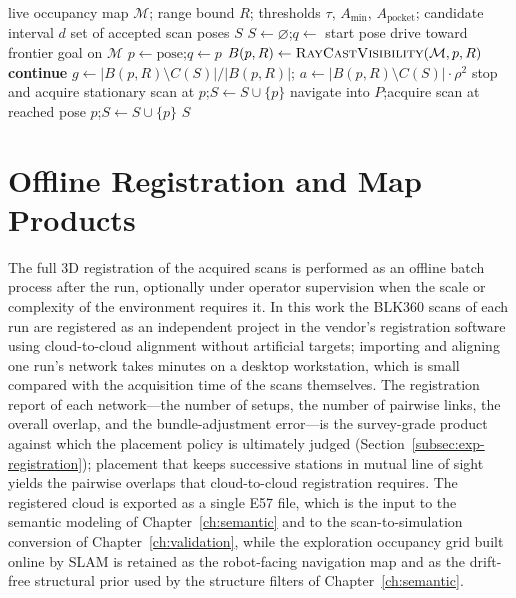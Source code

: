 \begin{algorithm}[H]
\caption{Visibility-based stop-and-scan placement}
\label{alg:placement}
\begin{algorithmic}[1]
\Require live occupancy map $\mathcal{M}$; range bound $R$; thresholds $\tau$, $A_{\min}$, $A_{\mathrm{pocket}}$; candidate interval $d$
\Ensure set of accepted scan poses $S$
\State $S \gets \varnothing$;\quad $q \gets$ start pose
  \State drive toward frontier goal on $\mathcal{M}$
    \State $p \gets \mathrm{pose}$;\quad $q \gets p$
    \State $B(p,R) \gets \textsc{RayCastVisibility}(\mathcal{M}, p, R)$
     \textbf{continue} 
    \EndIf
    \State $g \gets \lvert B(p,R)\setminus C(S)\rvert / \lvert B(p,R)\rvert$;\quad
           $a \gets \lvert B(p,R)\setminus C(S)\rvert \cdot \rho^2$
      \State stop and acquire stationary scan at $p$;\quad $S \gets S \cup \{p\}$
    \EndIf
  \EndIf
\EndWhile
{} 
  \State navigate into $P$;\quad acquire scan at reached pose $p$;\quad $S \gets S \cup \{p\}$
\EndWhile
\State \Return $S$
\end{algorithmic}
\end{algorithm}

\section{Offline Registration and Map Products}
\label{sec:registration}

The full 3D registration of the acquired scans is performed as an offline
batch process after the run, optionally under operator supervision when the
scale or complexity of the environment requires it. In this work the BLK360
scans of each run are registered as an independent project in the vendor's
registration software using cloud-to-cloud alignment without artificial
targets; importing and aligning one run's network takes minutes on a desktop
workstation, which is small compared with the acquisition time of the scans
themselves.
The registration report of each network---the number of setups, the number of
pairwise links, the overall overlap, and the bundle-adjustment error---is the
survey-grade product against which the placement policy is ultimately judged
(Section~\ref{subsec:exp-registration}); placement that keeps successive
stations in mutual line of sight yields the pairwise overlaps that
cloud-to-cloud registration requires. The registered cloud is exported as a
single E57 file, which is the input to the semantic modeling of
Chapter~\ref{ch:semantic} and to the scan-to-simulation conversion of
Chapter~\ref{ch:validation}, while the exploration occupancy grid built online
by SLAM is retained as the robot-facing navigation map and as the drift-free
structural prior used by the structure filters of Chapter~\ref{ch:semantic}.


